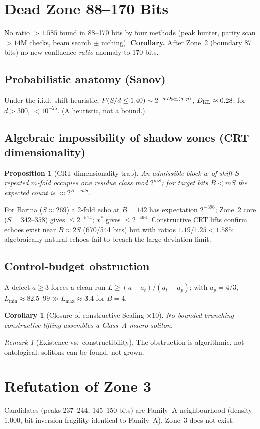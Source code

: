 \documentclass[12pt,a4paper]{article}
\newtheorem{proposition}[theorem]{Proposition}
\newtheorem{corollary}[theorem]{Corollary}
\theoremstyle{remark}
\newtheorem{remark}[theorem]{Remark}
\begin{document}
\section{Dead Zone 88--170 Bits}\label{sec:dead}
No ratio $>1.585$ found in 88--170 bits by four methods (peak hunter, parity
scan $>14$M checks, beam search $\pm$ niching). \textbf{Corollary.} After
Zone~2 (boundary 87 bits) no new confluence \emph{ratio} anomaly to 170 bits.
\subsection{Probabilistic anatomy (Sanov)}
Under the i.i.d.\ shift heuristic, $P(S/d\le1.40)\sim2^{-d\,D_{\rm KL}(q\|p)}$,
$D_{\rm KL}\approx0.28$; for $d>300$, $<10^{-25}$. (A heuristic, not a bound.)
\subsection{Algebraic impossibility of shadow zones (CRT dimensionality)}
\begin{proposition}[CRT dimensionality trap]
An admissible block $w$ of shift $S$ repeated $m$-fold occupies one residue
class mod $2^{mS}$; for target bits $B<mS$ the expected count is $\approx2^{B-mS}$.
\end{proposition}
For Barina ($S\approx269$) a 2-fold echo at $B=142$ has expectation $2^{-396}$;
Zone~2 core ($S=342$--$358$) gives $\le2^{-514}$; $x^*$ gives $\le2^{-496}$.
Constructive CRT lifts confirm echoes exist near $B\approx2S$ (670/544 bits) but
with ratios $1.19$/$1.25<1.585$: algebraically natural echoes fail to breach the
large-deviation limit.
\subsection{Control-budget obstruction}
A defect $a\ge3$ forces a clean run $L\ge(a-\bar a_t)/(\bar a_t-\bar a_p)$;
with $\bar a_p=4/3$, $L_{\min}\approx82.5$--$99\gg L_{\max}\approx3.4$ for $B=4$.
\begin{corollary}[Closure of constructive Scaling $\times10$]
No bounded-branching constructive lifting assembles a Class~A macro-soliton.
\end{corollary}
\begin{remark}[Existence vs.\ constructibility]
The obstruction is algorithmic, not ontological: solitons can be found, not grown.
\end{remark}

\section{Refutation of Zone 3}
Candidates (peaks 237--244, 145--150 bits) are Family~A neighbourhood (density
$1.000$, bit-inversion fragility identical to Family~A). Zone~3 does not exist.
\end{document}

